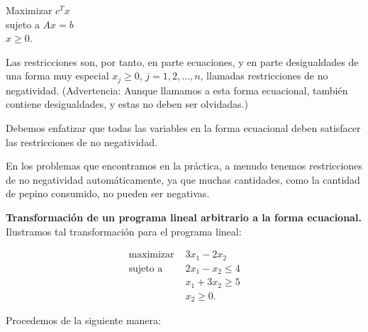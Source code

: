 \documentclass{article}
\begin{document}
\begin{tcolorbox}[colback=white, colframe=black, title=Forma estandar de un Problema de Programación Lineal]
\centering

Maximizar \( c^T x \) \\
sujeto a \( Ax = b \) \\
\( x \geq 0 \).
\end{tcolorbox}

Las restricciones son, por tanto, en parte ecuaciones, y en parte desigualdades de una forma muy especial \( x_j \geq 0 \), \( j = 1, 2, \ldots, n \), llamadas restricciones de no negatividad. (Advertencia: Aunque llamamos a esta forma ecuacional, también contiene desigualdades, y estas no deben ser olvidadas.)

Debemos enfatizar que todas las variables en la forma ecuacional deben satisfacer las restricciones de no negatividad.

En los problemas que encontramos en la práctica, a menudo tenemos restricciones de no negatividad automáticamente, ya que muchas cantidades, como la cantidad de pepino consumido, no pueden ser negativas.


\textbf{Transformación de un programa lineal arbitrario a la forma ecuacional.}
Ilustramos tal transformación para el programa lineal:

\begin{align*}
\text{maximizar } & 3x_1 - 2x_2 \\
\text{sujeto a } & 2x_1 - x_2 \leq 4 \\
& x_1 + 3x_2 \geq 5 \\
& x_2 \geq 0.
\end{align*}

Procedemos de la siguiente manera:
\end{document}
